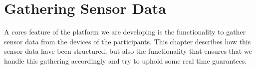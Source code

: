 \chapter{Gathering Sensor Data}
\label{cha:gathering_sensor_data}

A cores feature of the platform we are developing is the functionality to gather sensor data from the devices of the participants. This chapter describes how this sensor data have been structured, but also the functionality that ensures that we handle this gathering accordingly and try to uphold some real time guarantees.









